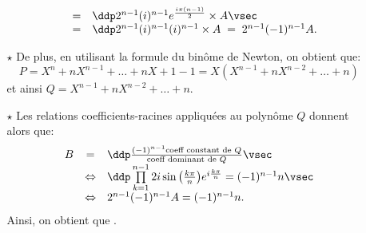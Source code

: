 \documentclass[a4paper, 11pt,reqno]{article}
\begin{document}
\begin{correction}
\begin{enumerate}
\begin{itemize}
$$\begin{array}{rcl}
					                                                                                                      & = & \ddp 2^{n-1}(i)^{n-1} e^{\frac{i\pi (n-1)}{2}}\times A \vsec          \\
					                                                                                                      & = & \ddp 2^{n-1}(i)^{n-1} (i)^{n-1}\times A \; = \; 2^{n-1}(-1)^{n-1} A.
				            \end{array}$$
			      \item[$\star$] De plus, en utilisant la formule du bin\^{o}me de Newton, on obtient que:
			            $$P=X^n+nX^{n-1}+\dots + nX+1-1
				            =X\left(X^{n-1}+nX^{n-2} +\dots+ n \right)$$
			            et ainsi $Q=X^{n-1}+nX^{n-2} +\dots+ n$.
			      \item[$\star$] Les relations coefficients-racines appliqu\'ees au polyn\^{o}me $Q$ donnent alors que:
			            $$\begin{array}{rcl}
					            B & =               & \ddp \frac{(-1)^{n-1} \textmd{coeff constant de } Q}{\textmd{coeff dominant de } Q}\vsec                \\
					              & \Leftrightarrow & \ddp \prod\limits_{k=1}^{n-1} 2i\sin{\left( \frac{k\pi}{n}\right)}e^{i\frac{k\pi}{n}}=(-1)^{n-1}n \vsec \\
					              & \Leftrightarrow & 2^{n-1}(-1)^{n-1} A = (-1)^{n-1}n.
				            \end{array}$$
			            Ainsi, on obtient que .
		      \end{itemize}
	\end{enumerate}
\end{correction}

\end{document}
